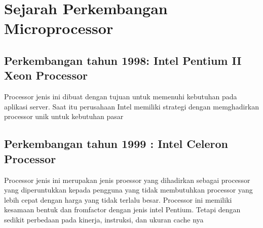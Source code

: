 \section{Sejarah Perkembangan Microprocessor}
\subsection{Perkembangan tahun 1998: Intel Pentium II Xeon Processor}
	Processor jenis ini dibuat dengan tujuan untuk memenuhi kebutuhan pada aplikasi server. Saat itu perusahaan Intel memiliki strategi dengan memghadirkan processor unik untuk kebutuhan pasar
\subsection{Perkembangan tahun 1999 : Intel Celeron Processor}
	Processor jenis ini merupakan jenis proessor yang dihadirkan sebagai processor yang diperuntukkan kepada pengguna yang tidak membutuhkan processor yang lebih cepat dengan harga yang tidak terlalu besar. Processor ini memiliki kesamaan bentuk dan fromfactor dengan jenis intel Pentium. Tetapi dengan sedikit perbedaan pada kinerja, instruksi, dan ukuran cache nya
